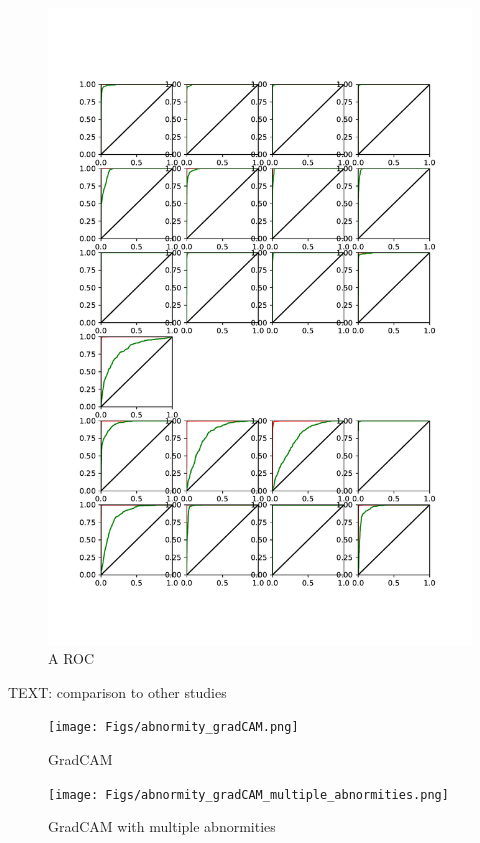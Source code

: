 \documentclass{article}
\begin{document}
			\begin{figure}[htbp]
				\centering
				\includegraphics[width=\linewidth]{Figs/abnormity_ROC.pdf}
				\caption{A ROC}
				\vspace{0.3cm}
				\label{fig:A_ROC}
			\end{figure}
			
			TEXT: comparison to other studies
				
			\begin{figure}[htbp]
				\centering
				\texttt{[image: Figs/abnormity\_gradCAM.png]}
				\caption{GradCAM}
				\vspace{0.3cm}
				\label{fig:gradCAM}
			\end{figure}
			\begin{figure}[htbp]
				\centering
				\texttt{[image: Figs/abnormity\_gradCAM\_multiple\_abnormities.png]}
				\caption{GradCAM with multiple abnormities}
				\vspace{0.3cm}
				\label{fig:gradCAM_multi_abnormity}
			\end{figure}
		
\end{document}
